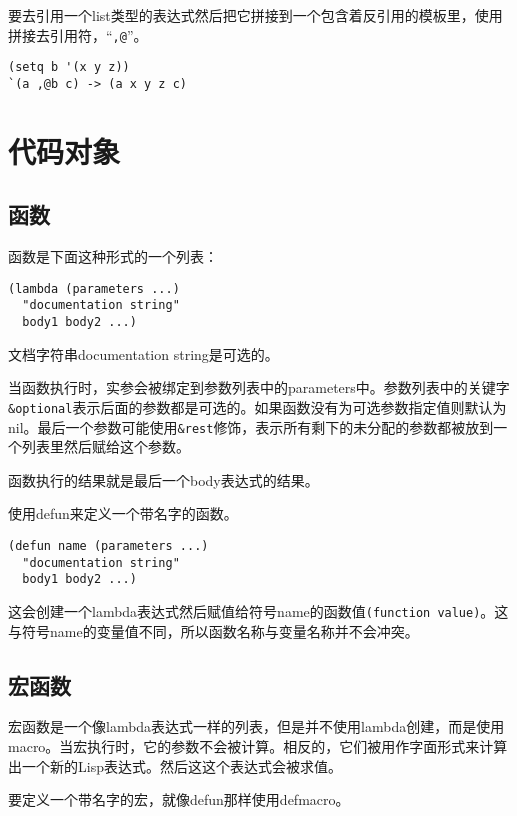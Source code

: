 要去引用一个list类型的表达式然后把它拼接到一个包含着反引用的模板里，使用拼接去引用符，“\texttt{,@}”。
\begin{verbatim}
(setq b '(x y z))
`(a ,@b c) -> (a x y z c)
\end{verbatim}

\section{代码对象}
\label{section:B-Code-Objects}

\subsection{函数}
\label{section:B-Functions}

函数是下面这种形式的一个列表：
\begin{verbatim}
(lambda (parameters ...)
  "documentation string"
  body1 body2 ...)
\end{verbatim}

文档字符串documentation string是可选的。

当函数执行时，实参会被绑定到参数列表中的parameters中。参数列表中的关键字\texttt{&optional}表示后面的参数都是可选的。如果函数没有为可选参数指定值则默认为nil。最后一个参数可能使用\texttt{&rest}修饰，表示所有剩下的未分配的参数都被放到一个列表里然后赋给这个参数。

函数执行的结果就是最后一个body表达式的结果。

使用defun来定义一个带名字的函数。
\begin{verbatim}
(defun name (parameters ...)
  "documentation string"
  body1 body2 ...)
\end{verbatim}

这会创建一个lambda表达式然后赋值给符号name的函数值\texttt{(function value)}。这与符号name的变量值不同，所以函数名称与变量名称并不会冲突。

\subsection{宏函数}
\label{section:B-Macro-Functions}

宏函数是一个像lambda表达式一样的列表，但是并不使用lambda创建，而是使用macro。当宏执行时，它的参数不会被计算。相反的，它们被用作字面形式来计算出一个新的Lisp表达式。然后这这个表达式会被求值。

要定义一个带名字的宏，就像defun那样使用defmacro。
